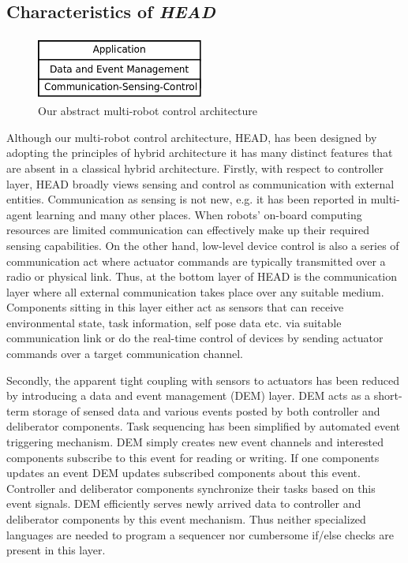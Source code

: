 \documentclass{ifacconf}
\begin{document}
\subsection{Characteristics of {\em HEAD}}
\begin{figure}
\begin{center}
\includegraphics[width=5.5cm,height=2.1cm]{./dia-files/abstract-arch}    %
\caption{Our abstract multi-robot control architecture} 
\label{fig:abstract-arch}
\end{center}
\end{figure}
Although our multi-robot control architecture, HEAD, has been designed by adopting the principles of hybrid architecture it has many distinct features that are absent in a  classical hybrid architecture.  Firstly, with respect to controller layer, HEAD  broadly views sensing and control as communication with external entities. Communication as sensing is not new, e.g. it has been reported in multi-agent learning \cite{Mataric1998} and many other places. When robots'  on-board computing resources are limited communication can effectively make up their required sensing capabilities. On the other hand, low-level device control is also a series of  communication act where actuator commands are typically transmitted over a  radio or physical link. Thus, at the bottom layer of HEAD is the communication layer where all external communication takes place over any suitable medium. Components sitting in this layer either act as sensors that can receive environmental state, task information, self pose data etc.  via suitable communication link or do the real-time control of devices by sending actuator commands over a target communication channel. 

Secondly, the apparent tight coupling with sensors to actuators has been reduced by introducing a data and event management (DEM) layer. DEM acts as a short-term storage of sensed data and various events posted by both  controller and deliberator components. Task sequencing has been  simplified by automated event triggering mechanism.  DEM simply creates new event channels and interested components subscribe to this event for reading or writing. If one components updates an event DEM updates subscribed components about this event. Controller and deliberator components synchronize their tasks based on this event signals. DEM efficiently serves newly arrived data to  controller and deliberator components by this event mechanism. Thus neither specialized languages are needed to program a sequencer nor cumbersome if/else  checks are present in this layer.
\end{document}
